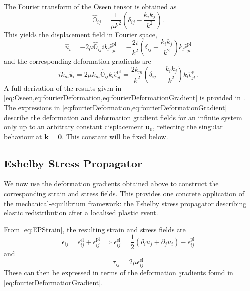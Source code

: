 The Fourier transform of the Oseen tensor is obtained as
\begin{equation}
    \hat{\mathbb{O}}_{ij} = \frac{1}{\mu k^2}\left( \delta_{ij} - \frac{k_ik_j}{k^2} \right).
    \label{eq:Oseen}
\end{equation}
This yields the displacement field in Fourier space,
\begin{equation}
    \hat{u}_i = -2\mu \hat{\mathbb{O}}_{ij} i k_l \hat{\epsilon}_{jl}^{\mathrm{pl}}
    = -\frac{2i}{k^2}\left( \delta_{ij} - \frac{k_ik_j}{k^2} \right) k_l \hat{\epsilon}_{jl}^{\mathrm{pl}}
    \label{eq:fourierDeformation}
\end{equation}
and the corresponding deformation gradients are
\begin{equation}
    ik_m\hat{u}_i
    = 2\mu k_m \hat{\mathbb{O}}_{ij} k_l \hat{\epsilon}_{jl}^{\mathrm{pl}}
    = \frac{2 k_m}{k^2}\left( \delta_{ij} - \frac{k_ik_j}{k^2} \right) k_l \hat{\epsilon}_{jl}^{\mathrm{pl}}.
    \label{eq:fourierDeformationGradient}
\end{equation}
A full derivation of the results given in \cref{eq:Oseen,eq:fourierDeformation,eq:fourierDeformationGradient} is provided in . The expressions in \cref{eq:fourierDeformation,eq:fourierDeformationGradient} describe the deformation and deformation gradient fields for an infinite system only up to an arbitrary constant displacement $\bm{u}_0$, reflecting the singular behaviour at $\bm{k}=\bm{0}$. This constant will be fixed below.

\subsection{Eshelby Stress Propagator} \label{sec:EshelbyPropogator}

We now use the deformation gradients obtained above to construct the corresponding strain and stress fields. This provides one concrete application of the mechanical-equilibrium framework: the Eshelby stress propagator describing elastic redistribution after a localised plastic event.

From \cref{eq:EPStrain}, the resulting strain and stress fields are
\begin{equation}
        \epsilon_{ij} = \epsilon_{ij}^{\mathrm{el}} + \epsilon_{ij}^{\mathrm{pl}} \implies \epsilon^{\mathrm{el}}_{ij} = \frac{1}{2}\left( \partial_i u_j + \partial_j u_i \right) - \epsilon_{ij}^{\mathrm{pl}}
        \label{eq:eshelbyStrain}
\end{equation}
and
\begin{equation}
    \tau_{ij} = 2\mu \epsilon^{\mathrm{el}}_{ij}
    \label{eq:eshelbyStress}
\end{equation}
These can then be expressed in terms of the deformation gradients found in \cref{eq:fourierDeformationGradient}.

